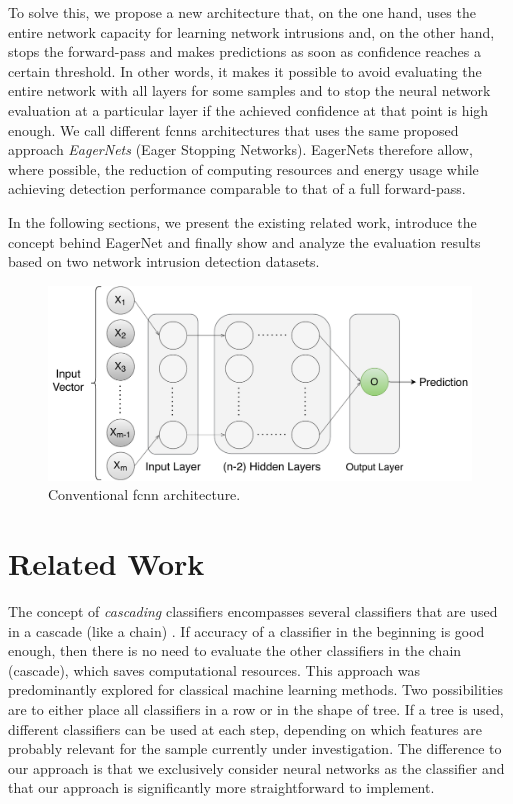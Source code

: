 \documentclass[conference]{IEEEtran}
\newcommand{\mynote}[3]{
    \fbox{\bfseries\sffamily\scriptsize#1}
    {\small$\blacktriangleright$\textsf{\emph{\color{#3}{#2}}}$\blacktriangleleft$}}
\newcommand{\todo}[1]{\mynote{TODO}{#1}{red}}
\begin{document}
To solve this, we propose a new architecture that, on the one hand, uses the entire network capacity for learning network intrusions and, on the other hand, stops the forward-pass and makes predictions as soon as confidence reaches a certain threshold. In other words, it makes it possible to avoid evaluating the entire network with all layers for some samples and to stop the neural network evaluation at a particular layer if the achieved confidence at that point is high enough. We call different \glspl{fcnn} architectures that uses the same proposed approach \emph{EagerNets} (Eager Stopping Networks). EagerNets therefore allow, where possible, the reduction of computing resources and energy usage while achieving detection performance comparable to that of a full forward-pass.

In the following sections, we present the existing related work, introduce the concept behind EagerNet and finally show and analyze the evaluation results based on two network intrusion detection datasets.

 \begin{figure}
  \includegraphics[width=\linewidth]{figures/fcnn_new.pdf}
  \caption{Conventional \gls{fcnn} architecture.}
  \label{fig:fcnn}
\end{figure}

\section{Related Work}

The concept of \textit{cascading} classifiers encompasses several classifiers that are used in a cascade (like a chain) \cite{viola_robust_2004, xu_classifier_2014, wang_efficient_2015}. If accuracy of a classifier in the beginning is good enough, then there is no need to evaluate the other classifiers in the chain (cascade), which saves computational resources. This approach was predominantly explored for classical machine learning methods. Two possibilities are to either place all classifiers in a row or in the shape of tree. If a tree is used, different classifiers can be used at each step, depending on which features are probably relevant for the sample currently under investigation. The difference to our approach is that we exclusively consider neural networks as the classifier and that our approach is significantly more straightforward to implement.
\end{document}
